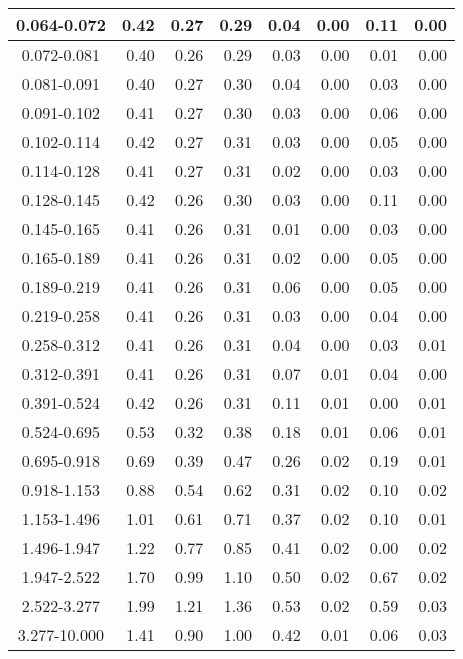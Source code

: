 \begin{table}[htbp]
\begin{center}
\begin{tabular}{ | c | r | r | r | r | r | r | r | }
0.064-0.072 & 0.42 & 0.27 & 0.29 & 0.04 & 0.00 & 0.11 & 0.00  \\ \hline
0.072-0.081 & 0.40 & 0.26 & 0.29 & 0.03 & 0.00 & 0.01 & 0.00  \\ \hline
0.081-0.091 & 0.40 & 0.27 & 0.30 & 0.04 & 0.00 & 0.03 & 0.00  \\ \hline
0.091-0.102 & 0.41 & 0.27 & 0.30 & 0.03 & 0.00 & 0.06 & 0.00  \\ \hline
0.102-0.114 & 0.42 & 0.27 & 0.31 & 0.03 & 0.00 & 0.05 & 0.00  \\ \hline
0.114-0.128 & 0.41 & 0.27 & 0.31 & 0.02 & 0.00 & 0.03 & 0.00  \\ \hline
0.128-0.145 & 0.42 & 0.26 & 0.30 & 0.03 & 0.00 & 0.11 & 0.00  \\ \hline
0.145-0.165 & 0.41 & 0.26 & 0.31 & 0.01 & 0.00 & 0.03 & 0.00  \\ \hline
0.165-0.189 & 0.41 & 0.26 & 0.31 & 0.02 & 0.00 & 0.05 & 0.00  \\ \hline
0.189-0.219 & 0.41 & 0.26 & 0.31 & 0.06 & 0.00 & 0.05 & 0.00  \\ \hline
0.219-0.258 & 0.41 & 0.26 & 0.31 & 0.03 & 0.00 & 0.04 & 0.00  \\ \hline
0.258-0.312 & 0.41 & 0.26 & 0.31 & 0.04 & 0.00 & 0.03 & 0.01  \\ \hline
0.312-0.391 & 0.41 & 0.26 & 0.31 & 0.07 & 0.01 & 0.04 & 0.00  \\ \hline
0.391-0.524 & 0.42 & 0.26 & 0.31 & 0.11 & 0.01 & 0.00 & 0.01  \\ \hline
0.524-0.695 & 0.53 & 0.32 & 0.38 & 0.18 & 0.01 & 0.06 & 0.01  \\ \hline
0.695-0.918 & 0.69 & 0.39 & 0.47 & 0.26 & 0.02 & 0.19 & 0.01  \\ \hline
0.918-1.153 & 0.88 & 0.54 & 0.62 & 0.31 & 0.02 & 0.10 & 0.02  \\ \hline
1.153-1.496 & 1.01 & 0.61 & 0.71 & 0.37 & 0.02 & 0.10 & 0.01  \\ \hline
1.496-1.947 & 1.22 & 0.77 & 0.85 & 0.41 & 0.02 & 0.00 & 0.02  \\ \hline
1.947-2.522 & 1.70 & 0.99 & 1.10 & 0.50 & 0.02 & 0.67 & 0.02  \\ \hline
2.522-3.277 & 1.99 & 1.21 & 1.36 & 0.53 & 0.02 & 0.59 & 0.03  \\ \hline
3.277-10.000 & 1.41 & 0.90 & 1.00 & 0.42 & 0.01 & 0.06 & 0.03  \\ \hline
\end{tabular}
\end{center}
\end{table}



